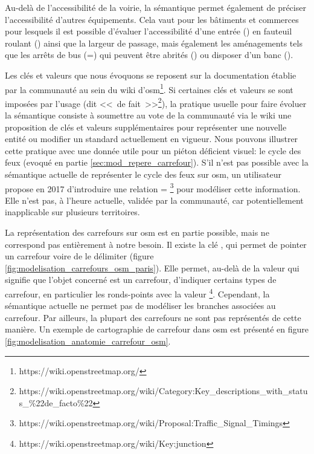 \newpar{}

Au-delà de l'accessibilité de la voirie, la sémantique permet également de préciser l'accessibilité d'autres équipements. Cela vaut pour les bâtiments et commerces pour lesquels il est possible d'évaluer l'accessibilité d'une entrée () en fauteuil roulant () ainsi que la largeur de passage, mais également les aménagements tels que les arrêts de bus (=) qui peuvent être abrités () ou disposer d'un banc ().

\newpar{}


Les clés et valeurs que nous évoquons se reposent sur la documentation établie par la communauté au sein du wiki d'\gls{osm}\footnote{https://wiki.openstreetmap.org/}. Si certaines clés et valeurs se sont imposées par l'usage (dit <<~de fait~>>\footnote{https://wiki.openstreetmap.org/wiki/Category:Key\_descriptions\_with\_status\_\%22de\_facto\%22}), la pratique usuelle pour faire évoluer la sémantique consiste à soumettre au vote de la communauté via le wiki une proposition de clés et valeurs supplémentaires pour représenter une nouvelle entité ou modifier un standard actuellement en vigueur. Nous pouvons illustrer cette pratique avec une donnée utile pour un piéton déficient visuel: le cycle des feux (evoqué en partie \ref{sec:mod_repere_carrefour}). S'il n'est pas possible avec la sémantique actuelle de représenter le cycle des feux sur \gls{osm}, un utilisateur propose en 2017 d'introduire une relation = \footnote{https://wiki.openstreetmap.org/wiki/Proposal:Traffic\_Signal\_Timings} pour modéliser cette information. Elle n'est pas, à l'heure actuelle, validée par la communauté, car potentiellement inapplicable sur plusieurs territoires.

\newpar{}


La représentation des carrefours sur \gls{osm} est en partie possible, mais ne correspond pas entièrement à notre besoin. Il existe la clé , qui permet de pointer un carrefour voire de le délimiter (figure \ref{fig:modelisation_carrefours_osm_paris}). Elle permet, au-delà de la valeur  qui signifie que l'objet concerné est un carrefour, d'indiquer certains types de carrefour, en particulier les ronds-points avec la valeur \footnote{https://wiki.openstreetmap.org/wiki/Key:junction}. Cependant, la sémantique actuelle ne permet pas de modéliser les branches associées au carrefour. Par ailleurs, la plupart des carrefours ne sont pas représentés de cette manière. Un exemple de cartographie de carrefour dans \gls{osm} est présenté en figure \ref{fig:modelisation_anatomie_carrefour_osm}.

